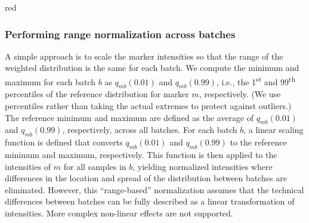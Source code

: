 \documentclass{article}
\begin{document}
\begin{color}{red}
\subsubsection{Performing range normalization across batches}
A simple approach is to scale the marker intensities so that the range of the weighted distribution is the same for each batch.
We compute the minimum and maximum for each batch $b$ as $q_{mb}(0.01)$ and $q_{mb}(0.99)$, i.e., the 1\textsuperscript{st} and 99\textsuperscript{th} percentiles of the reference distribution for marker $m$, respectively.
(We use percentiles rather than taking the actual extremes to protect against outliers.)
The reference minimum and maximum are defined as the average of $q_{mb}(0.01)$ and $q_{mb}(0.99)$, respectively, across all batches.
For each batch $b$, a linear scaling function is defined that converts $q_{mb}(0.01)$ and $q_{mb}(0.99)$ to the reference minimum and maximum, respectively.
This function is then applied to the intensities of $m$ for all samples in $b$, yielding normalized intensities where differences in the location and spread of the distribution between batches are eliminated.
However, this ``range-based'' normalization assumes that the technical differences between batches can be fully described as a linear transformation of intensities.
More complex non-linear effects are not supported.


\end{color}
\end{document}
